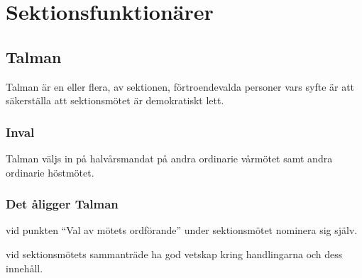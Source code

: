 \section{Sektionsfunktionärer}

\subsection{Talman}
Talman är en eller flera, av sektionen, förtroendevalda personer vars syfte är att säkerställa att sektionsmötet är demokratiskt lett. 

\subsubsection{Inval}
Talman väljs in på halvårsmandat på andra ordinarie vårmötet samt andra ordinarie höstmötet.
\subsubsection{Det åligger Talman}
\begin{att}
	\item vid punkten ``Val av mötets ordförande'' under sektionsmötet nominera sig själv.
	\item vid sektionsmötets sammanträde ha god vetskap kring handlingarna och dess innehåll.
\end{att}